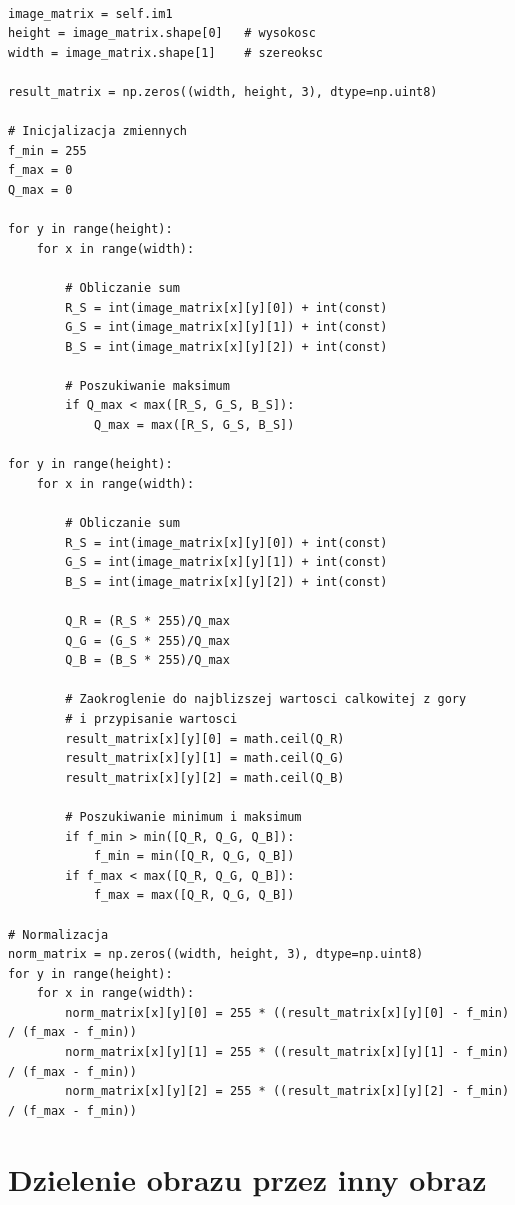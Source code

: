 \documentclass[final,a4paper,openany,12pt]{mwbk}
\begin{document}
\begin{lstlisting}[caption=  Dzielenie obrazu barwowego przez (zadaną) liczbę]

image_matrix = self.im1
height = image_matrix.shape[0]   # wysokosc
width = image_matrix.shape[1]    # szereoksc

result_matrix = np.zeros((width, height, 3), dtype=np.uint8)

# Inicjalizacja zmiennych
f_min = 255
f_max = 0
Q_max = 0

for y in range(height):
    for x in range(width):  

        # Obliczanie sum
        R_S = int(image_matrix[x][y][0]) + int(const)
        G_S = int(image_matrix[x][y][1]) + int(const)
        B_S = int(image_matrix[x][y][2]) + int(const)

        # Poszukiwanie maksimum
        if Q_max < max([R_S, G_S, B_S]):
            Q_max = max([R_S, G_S, B_S])

for y in range(height):
    for x in range(width):  

        # Obliczanie sum
        R_S = int(image_matrix[x][y][0]) + int(const)
        G_S = int(image_matrix[x][y][1]) + int(const)
        B_S = int(image_matrix[x][y][2]) + int(const)

        Q_R = (R_S * 255)/Q_max
        Q_G = (G_S * 255)/Q_max
        Q_B = (B_S * 255)/Q_max
            
        # Zaokroglenie do najblizszej wartosci calkowitej z gory
        # i przypisanie wartosci
        result_matrix[x][y][0] = math.ceil(Q_R)
        result_matrix[x][y][1] = math.ceil(Q_G)
        result_matrix[x][y][2] = math.ceil(Q_B)

        # Poszukiwanie minimum i maksimum                
        if f_min > min([Q_R, Q_G, Q_B]):
            f_min = min([Q_R, Q_G, Q_B])
        if f_max < max([Q_R, Q_G, Q_B]):
            f_max = max([Q_R, Q_G, Q_B])

# Normalizacja
norm_matrix = np.zeros((width, height, 3), dtype=np.uint8)
for y in range(height):
    for x in range(width):
        norm_matrix[x][y][0] = 255 * ((result_matrix[x][y][0] - f_min) / (f_max - f_min))
        norm_matrix[x][y][1] = 255 * ((result_matrix[x][y][1] - f_min) / (f_max - f_min))
        norm_matrix[x][y][2] = 255 * ((result_matrix[x][y][2] - f_min) / (f_max - f_min))

\end{lstlisting}
\newpage

\section{ Dzielenie obrazu przez inny obraz }
\end{document}
